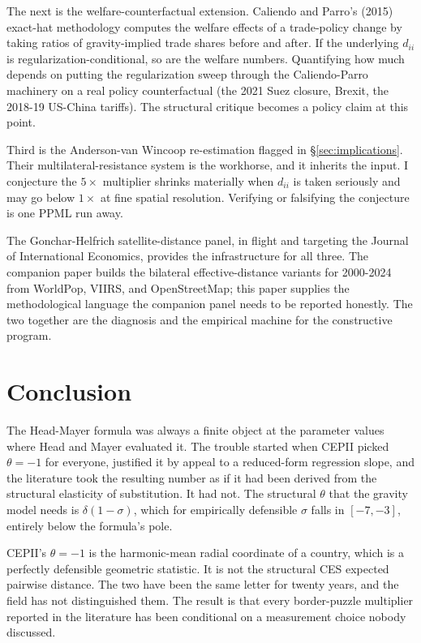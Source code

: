 \documentclass[11pt, letterpaper]{article}
\theoremstyle{definition}
\newcommand{\dii}{d_{ii}}
\begin{document}
The next is the welfare-counterfactual extension. Caliendo and
Parro's (2015) exact-hat methodology computes the welfare effects
of a trade-policy change by taking ratios of gravity-implied trade
shares before and after. If the underlying $\dii$ is
regularization-conditional, so are the welfare numbers. Quantifying
how much depends on putting the regularization sweep through the
Caliendo-Parro machinery on a real policy counterfactual (the 2021
Suez closure, Brexit, the 2018-19 US-China tariffs). The structural
critique becomes a policy claim at this point.

Third is the Anderson-van Wincoop re-estimation flagged in
§\ref{sec:implications}. Their multilateral-resistance system is
the workhorse, and it inherits the input. I conjecture the
$5\times$ multiplier shrinks materially when $\dii$ is taken
seriously and may go below $1\times$ at fine spatial resolution.
Verifying or falsifying the conjecture is one PPML run away.

The Gonchar-Helfrich satellite-distance panel, in flight and
targeting the Journal of International Economics, provides the
infrastructure for all three. The companion paper builds the
bilateral effective-distance variants for 2000-2024 from WorldPop,
VIIRS, and OpenStreetMap; this paper supplies the methodological
language the companion panel needs to be reported honestly. The
two together are the diagnosis and the empirical machine for the
constructive program.

\section{Conclusion}
\label{sec:conclusion}

The Head-Mayer formula was always a finite object at the parameter
values where Head and Mayer evaluated it. The trouble started when
CEPII picked $\theta = -1$ for everyone, justified it by appeal to a
reduced-form regression slope, and the literature took the resulting
number as if it had been derived from the structural elasticity of
substitution. It had not. The structural $\theta$ that the gravity
model needs is $\delta(1-\sigma)$, which for empirically defensible
$\sigma$ falls in $[-7,-3]$, entirely below the formula's pole.

CEPII's $\theta = -1$ is the harmonic-mean radial coordinate of a
country, which is a perfectly defensible geometric statistic. It is
not the structural CES expected pairwise distance. The two have
been the same letter for twenty years, and the field has not
distinguished them. The result is that every border-puzzle multiplier
reported in the literature has been conditional on a measurement
choice nobody discussed.
\end{document}
